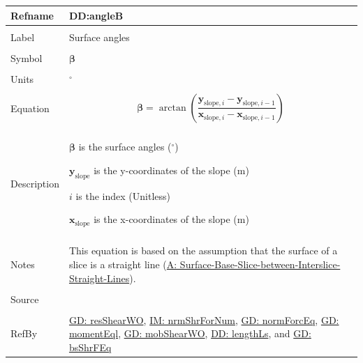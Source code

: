 \documentclass[12pt]{article}
\begin{document}
\noindent \begin{minipage}{\textwidth}
\begin{tabular}{>{\raggedright}p{}>{\raggedright\arraybackslash}p{}}
\toprule \textbf{Refname} & \textbf{DD:angleB}
\label{DD:angleB}
\\ \midrule \\
Label & Surface angles
\\ \midrule \\
Symbol & $\mathbf{β}$
\\ \midrule \\
Units & ${}^{\circ}$
\\ \midrule \\
Equation & \begin{displaymath}
           \mathbf{β}=\arctan\left(\frac{{\mathbf{y}_{\text{slope},i}}-{\mathbf{y}_{\text{slope},i-1}}}{{\mathbf{x}_{\text{slope},i}}-{\mathbf{x}_{\text{slope},i-1}}}\right)
           \end{displaymath}
\\ \midrule \\
Description & \begin{symbDescription}
              \item{$\mathbf{β}$ is the surface angles (${}^{\circ}$)}
              \item{${\mathbf{y}_{\text{slope}}}$ is the y-coordinates of the slope (m)}
              \item{$i$ is the index (Unitless)}
              \item{${\mathbf{x}_{\text{slope}}}$ is the x-coordinates of the slope (m)}
              \end{symbDescription}
\\ \midrule \\
Notes & This equation is based on the assumption that the surface of a slice is a straight line (\hyperref[assumpSBSBISL]{A: Surface-Base-Slice-between-Interslice-Straight-Lines}).
\\ \midrule \\
Source & \cite{fredlund1977}
\\ \midrule \\
RefBy & \hyperref[GD:resShearWO]{GD: resShearWO}, \hyperref[IM:nrmShrForNum]{IM: nrmShrForNum}, \hyperref[GD:normForcEq]{GD: normForcEq}, \hyperref[GD:momentEql]{GD: momentEql}, \hyperref[GD:mobShearWO]{GD: mobShearWO}, \hyperref[DD:lengthLs]{DD: lengthLs}, and \hyperref[GD:bsShrFEq]{GD: bsShrFEq}
\\ \bottomrule
\end{tabular}
\end{minipage}
\par~
\end{document}

